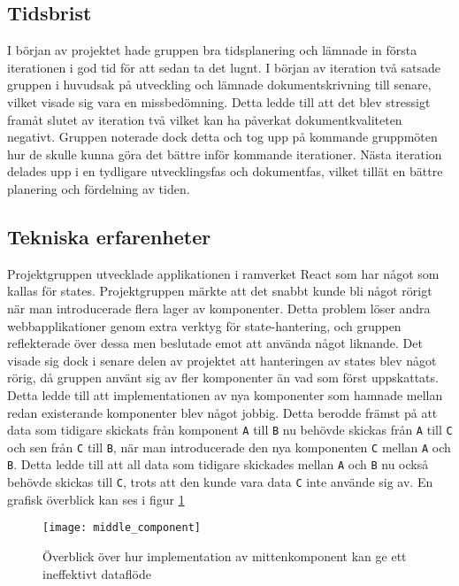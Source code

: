 \subsection{Tidsbrist}
I början av projektet hade gruppen bra tidsplanering och lämnade in första iterationen i god tid för att sedan ta det lugnt. I början av iteration två satsade gruppen i huvudsak på utveckling och lämnade dokumentskrivning till senare, vilket visade sig vara en missbedömning. Detta ledde till att det blev stressigt framåt slutet av iteration två vilket kan ha påverkat dokumentkvaliteten negativt. Gruppen noterade dock detta och tog upp på kommande gruppmöten hur de skulle kunna göra det bättre inför kommande iterationer. Nästa iteration delades upp i en tydligare utvecklingsfas och dokumentfas, vilket tillät en bättre planering och fördelning av tiden.

\subsection{Tekniska erfarenheter}
Projektgruppen utvecklade applikationen i ramverket React som har något som kallas för states. Projektgruppen märkte att det snabbt kunde bli något rörigt när man introducerade flera lager av komponenter. Detta problem löser andra webbapplikationer genom extra verktyg för state-hantering, och gruppen reflekterade över dessa men beslutade emot att använda något liknande. Det visade sig dock i senare delen av projektet att hanteringen av states blev något rörig, då gruppen använt sig av fler komponenter än vad som först uppskattats. Detta ledde till att implementationen av nya komponenter som hamnade mellan redan existerande komponenter blev något jobbig. Detta berodde främst på att data som tidigare skickats från komponent \texttt{A} till \texttt{B} nu behövde skickas från \texttt{A} till \texttt{C} och sen från \texttt{C} till \texttt{B}, när man introducerade den nya komponenten \texttt{C} mellan \texttt{A} och \texttt{B}. Detta ledde till att all data som tidigare skickades mellan \texttt{A} och \texttt{B} nu också behövde skickas till \texttt{C}, trots att den kunde vara data \texttt{C} inte använde sig av. En grafisk överblick kan ses i figur \ref{fig:middle_component}

\begin{figure}[H]
    \centering
    \texttt{[image: middle\_component]}
    \caption{Överblick över hur implementation av mittenkomponent kan ge ett ineffektivt dataflöde}
    \label{fig:middle_component}
\end{figure}

